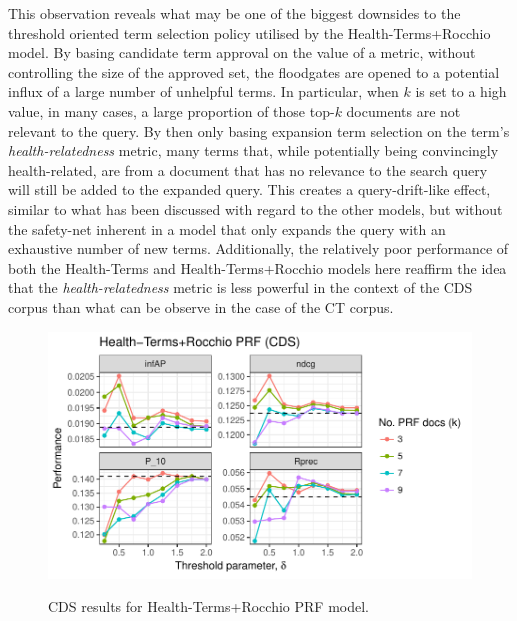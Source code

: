 \documentclass[a4paper]{report}
\begin{document}
This observation reveals what may be one of the biggest downsides to the threshold oriented term selection policy utilised by the Health-Terms+Rocchio model. By basing candidate term approval on the value of a metric, without controlling the size of the approved set, the floodgates are opened to a potential influx of a large number of unhelpful terms. In particular, when $k$ is set to a high value, in many cases, a large proportion of those top-$k$ documents are not relevant to the query. By then only basing expansion term selection on the term's \textit{health-relatedness} metric, many terms that, while potentially being convincingly health-related, are from a document that has no relevance to the search query will still be added to the expanded query. This creates a query-drift-like effect, similar to what has been discussed with regard to the other models, but without the safety-net inherent in a model that only expands the query with an exhaustive number of new terms. Additionally, the relatively poor performance of both the Health-Terms and Health-Terms+Rocchio models here reaffirm the idea that the \textit{health-relatedness} metric is less powerful in the context of the CDS corpus than what can be observe in the case of the CT corpus.

\begin{figure}
\centering
\caption{CDS results for Health-Terms+Rocchio PRF model.}
\includegraphics[width=.9\columnwidth]{cds-rocchiohtprf.pdf}
\label{cds_rocchiohtprf_results}
\end{figure}
\end{document}
